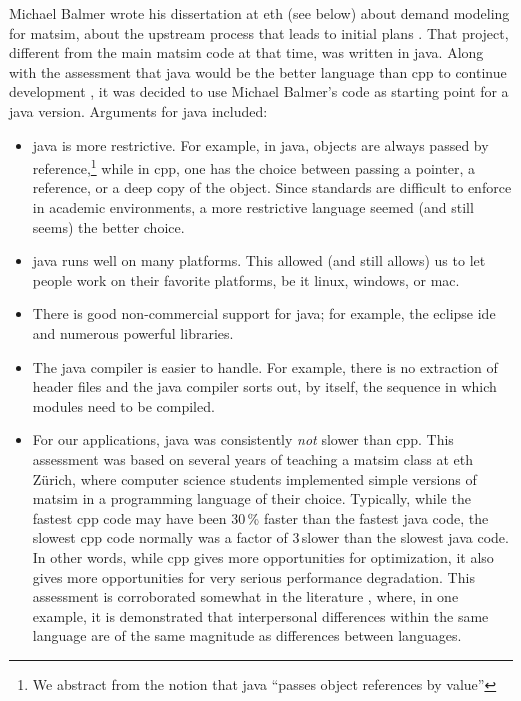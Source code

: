 Michael Balmer wrote his dissertation at \gls{eth} (see below) about demand modeling for \gls{matsim}, \ie about the upstream process that leads to initial plans
\citep{Balmer_PhDThesis_2007}.  That project, different from the main \gls{matsim} code at that time, was written in \gls{java}.  Along with the assessment that \gls{java} would be the better language than \gls{cpp} to continue development%
, it was decided to use Michael Balmer's code as starting point for a \gls{java} version.  Arguments for \gls{java} included:
%
\begin{itemize}\styleItemize
\item  \gls{java} is more restrictive. For example, in \gls{java}, objects are always passed by reference,\footnote{%
%
We abstract
from the notion that \gls{java} ``passes object references by value'' %
%
} while in \gls{cpp}, one has the choice between passing a pointer, a reference, or a deep copy of the object.  Since standards are difficult to enforce in academic environments, a more restrictive language seemed (and still seems) the better choice.

\item \gls{java} runs well on many platforms.  This allowed (and still allows) us to let people work on their favorite platforms, be it \gls{linux}, \gls{windows}, or \gls{mac}.

\item There is good non-commercial support for \gls{java}; for example, the \gls{eclipse} \gls{ide} and numerous powerful libraries.

\item The \gls{java} compiler is easier to handle.  For example, there is no extraction of header files and the \gls{java} compiler sorts out, by itself, the sequence in which modules need to be compiled.

\item For our applications, \gls{java} was consistently \emph{not} slower than \gls{cpp}.  This assessment was based on several years of teaching a \gls{matsim} class at \gls{eth} Zürich, where computer science students implemented simple versions of \gls{matsim} in a programming language of their choice.  Typically, while the fastest \gls{cpp} code may have been 30\,\% faster than the fastest \gls{java} code, the slowest \gls{cpp} code normally was a factor of 3\,slower than the slowest \gls{java} code.  In other words, while \gls{cpp} gives more opportunities for optimization, it also gives more opportunities for very serious performance degradation.  This assessment is corroborated somewhat in the literature \citep{Prechelt1999EfficiencyJavaVsCpp}, where, in one example, it is demonstrated that interpersonal differences within the same language are of the same magnitude as  differences between languages.


\end{itemize}
